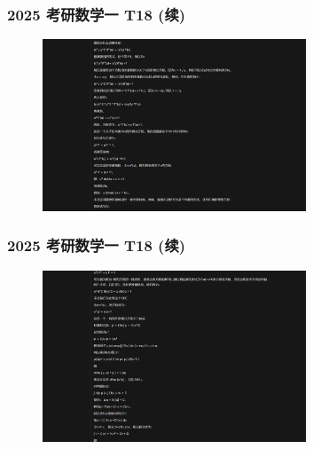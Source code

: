 \begin{frame}
    \frametitle{2025 考研数学一 T18 (续)}
    \begin{figure}
        \centering
        \includegraphics[width=0.7\textwidth]{./pic/11.png} %
        \label{fig:kaoyan_solution_3}
    \end{figure}
\end{frame}

\begin{frame}
    \frametitle{2025 考研数学一 T18 (续)}
    \begin{figure}
        \centering
        \includegraphics[width=0.7\textwidth]{./pic/12.png} %
        \label{fig:kaoyan_solution_4}
    \end{figure}
\end{frame}

